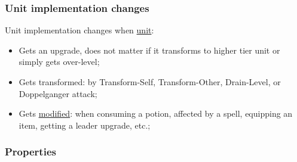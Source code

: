 \subsubsection{Unit implementation changes}
Unit implementation changes when \hyperref[Unit]{unit}:
\begin{itemize}
\item Gets an upgrade, does not matter if it transforms to higher tier unit or simply gets over-level;
\item Gets transformed: by Transform-Self, Transform-Other, Drain-Level, or Doppelganger attack;
\item Gets \hyperref[Modifier]{modified}: when consuming a potion, affected by a spell, equipping an item, getting a leader upgrade, etc.;
\end{itemize}
\newpage
\subsubsection{Properties}
